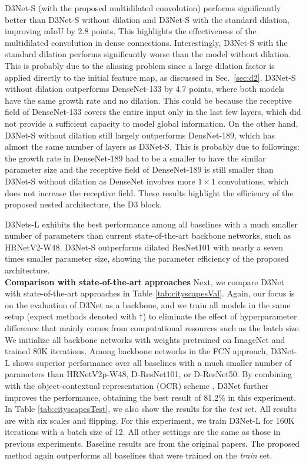 \documentclass[final]{cvpr}
\begin{document}
D3Net-S (with the proposed multidilated convolution) performs significantly better than D3Net-S without dilation and D3Net-S with the standard dilation, improving mIoU by 2.8 points. This highlights the effectiveness of the multidilated convolution in dense connections. Interestingly, D3Net-S with the standard dilation performs significantly worse than the model without dilation. This is probably due to the aliasing problem since a large dilation factor is applied directly to the initial feature map, as discussed in Sec.~\ref{sec:d2}. D3Net-S without dilation outperforms DenseNet-133 by 4.7 points, where both models have the same growth rate and no dilation. This could be because the receptive field of DenseNet-133 covers the entire input only in the last few layers, which did not provide a sufficient capacity to model global information. On the other hand, D3Net-S without dilation still largely outperforms DensNet-189, which has almost the same number of layers as D3Net-S.  This is probably due to followings: the growth rate in DenseNet-189 had to be a smaller to have the similar parameter size and the receptive field of DenseNet-189 is still smaller than D3Net-S without dilation as DenseNet involves more $1\times1$ convolutions, which does not increase the receptive field. These results highlight the efficiency of the proposed nested architecture, the D3 block.

D3Nets-L exhibits the best performance among all baselines with a much smaller number of parameters than current state-of-the-art backbone networks, such as HRNetV2-W48. D3Net-S outperforms dilated ResNet101 with nearly a seven times smaller parameter size, showing the parameter efficiency of the proposed architecture.
\vspace{3mm}\\
\textbf{Comparison with state-of-the-art approaches} \hspace{1mm}
Next, we compare D3Net with state-of-the-art approaches in Table \ref{tab:cityscapesVal}. Again, our focus is on the evaluation of D3Net as a backbone, and we train all models in the same setup (expect methods denoted with $\dagger$) to eliminate the effect of hyperparameter difference that mainly comes from computational resources such as the batch size.  We initialize all backbone networks with weights pretrained on ImageNet \cite{ILSVRC15} and trained 80K iterations.
Among backbone networks in the FCN approach, D3Net-L shows superior performance over all baselines with a much smaller number of parameters than HRNetV2p-W48\cite{WangSCJDZLMTWLX19}, D-ResNet101, or D-ResNet50. By combining with the object-contextual representation (OCR)
scheme \cite{Yuan20OCR}, D3Net further improves the performance, obtaining the best result of 81.2\% in this experiment.
In Table \ref{tab:cityscapesTest}, we also show the results for the \textit{test} set. All results are with six scales and flipping. For this experiment, we train D3Net-L for 160K iterations with a batch size of 12. All other settings are the same as those in previous experiments. 
Baseline results are from the original papers. The proposed method again outperforms all baselines that were trained on the \textit{train} set. 
\end{document}

